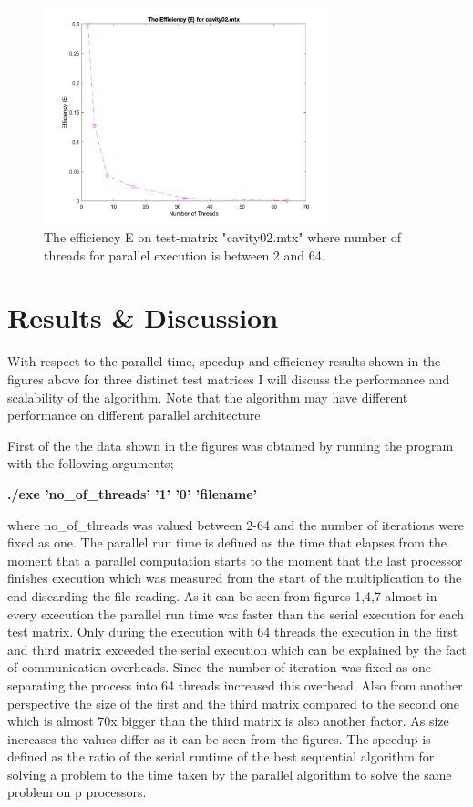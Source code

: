 \documentclass[a4paper,11pt]{article}
\theoremstyle{mytheor}
\begin{document}
\begin{figure}[!htb]
    \centering
    \includegraphics[width=0.75\textwidth]{e3}
    \caption{The efficiency E on test-matrix "cavity02.mtx" where number of threads for parallel execution is between 2 and 64.}
\end{figure}

\FloatBarrier
\section{Results \& Discussion}

With respect to the parallel time, speedup and efficiency results shown in the figures above for three distinct test matrices I will discuss the performance and scalability of the algorithm. Note that the algorithm may have different performance on different parallel architecture.

First of the the data shown in the figures was obtained by running the program with the following arguments;

\centerline{\textbf{./exe 'no\_of\_threads' '1' '0' 'filename'}}

where no\_of\_threads was valued between 2-64 and the number of iterations were fixed as one.
\newline
\newline
The parallel run time is defined as the time that elapses from the moment that a parallel computation starts to the moment that the last processor finishes execution which was measured from the start of the multiplication to the end discarding the file reading. As it can be seen from figures 1,4,7 almost in every execution the parallel run time was faster than the serial execution for each test matrix. Only during the execution with 64 threads the execution in the first and third matrix exceeded the serial execution which can be explained by the fact of communication overheads. Since the number of iteration was fixed as one separating the process into 64 threads increased this overhead. Also from another perspective the size of the first and the third matrix compared to the second one which is almost 70x bigger than the third matrix is also another factor. As size increases the values differ as it can be seen from the figures.
\newline
\newline
The speedup is defined as the ratio of the serial runtime of the best sequential algorithm for solving a problem to the time taken by the parallel algorithm to solve the same problem on p processors.
\end{document}
